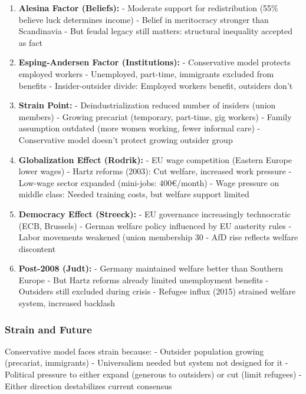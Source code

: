 \begin{enumerate}

\item \textbf{Alesina Factor (Beliefs):}
   - Moderate support for redistribution (55\% believe luck determines income)
   - Belief in meritocracy stronger than Scandinavia
   - But feudal legacy still matters: structural inequality accepted as fact

\item \textbf{Esping-Andersen Factor (Institutions):}
   - Conservative model protects employed workers
   - Unemployed, part-time, immigrants excluded from benefits
   - Insider-outsider divide: Employed workers benefit, outsiders don't

\item \textbf{Strain Point:}
   - Deindustrialization reduced number of insiders (union members)
   - Growing precariat (temporary, part-time, gig workers)
   - Family assumption outdated (more women working, fewer informal care)
   - Conservative model doesn't protect growing outsider group

\item \textbf{Globalization Effect (Rodrik):}
   - EU wage competition (Eastern Europe lower wages)
   - Hartz reforms (2003): Cut welfare, increased work pressure
   - Low-wage sector expanded (mini-jobs: 400€/month)
   - Wage pressure on middle class: Needed training costs, but welfare support limited

\item \textbf{Democracy Effect (Streeck):}
   - EU governance increasingly technocratic (ECB, Brussels)
   - German welfare policy influenced by EU austerity rules
   - Labor movements weakened (union membership 30%
   - AfD rise reflects welfare discontent

\item \textbf{Post-2008 (Judt):}
   - Germany maintained welfare better than Southern Europe
   - But Hartz reforms already limited unemployment benefits
   - Outsiders still excluded during crisis
   - Refugee influx (2015) strained welfare system, increased backlash

\end{enumerate}

\subsubsection{Strain and Future}

Conservative model faces strain because:
- Outsider population growing (precariat, immigrants)
- Universalism needed but system not designed for it
- Political pressure to either expand (generous to outsiders) or cut (limit refugees)
- Either direction destabilizes current consensus

